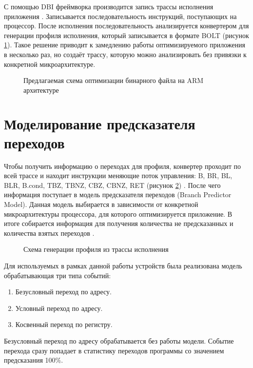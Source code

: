 С помощью DBI фреймворка производится запись трассы исполнения приложения \cite{Hong2019}. Записывается последовательность инструкций, поступающих на процессор. После исполнения последовательность анализируется конвертером для генерации профиля исполнения, который записывается в формате BOLT (рисунок \cref{fig:NewSteps}). Такое решение приводит к замедлению работы оптимизируемого приложения в несколько раз, но создаёт трассу, которую можно анализировать без привязки к конкретной микроархитектуре. \cite{vakbib1} \cite{confbib2}

\begin{figure}[ht]
    \centerfloat{
        \texttt{[image: 9]}
    }
    \caption{Предлагаемая схема оптимизации бинарного файла на ARM архитектуре}\label{fig:NewSteps}
\end{figure}

\section{Моделирование предсказателя переходов}\label{sec:ch2/sec3}
Чтобы получить информацию о переходах для профиля, конвертер проходит по всей трассе и находит инструкции меняющие поток управления: B, BR, BL, BLR, B.cond, TBZ, TBNZ, CBZ, CBNZ, RET (рисунок \cref{fig:ProfilefromTrace}) \cite{Kalla2017}. После чего информация поступает в модель предсказателя переходов (Branch Predictor Model). Данная модель выбирается в зависимости от конкретной микроархитектуры процессора, для которого оптимизируется приложение. В итоге собирается информация для получения количества не предсказанных и количества взятых переходов \cite{Ball1993} \cite{Fisher1992}.

\begin{figure}[ht]
    \centerfloat{
        \texttt{[image: 10]}
    }
    \caption{Схема генерации профиля из трассы исполнения}\label{fig:ProfilefromTrace}
\end{figure}

Для используемых в рамках данной работы устройств была реализована модель обрабатывающая три типа событий:
\begin{enumerate}[beginpenalty=10000]
  \item Безусловный переход по адресу.
  \item Условный переход по адресу.
  \item Косвенный переход по регистру.
\end{enumerate}

Безусловный переход по адресу обрабатывается без работы модели. Событие перехода сразу попадает в статистику переходов программы со значением предсказания 100\%.

